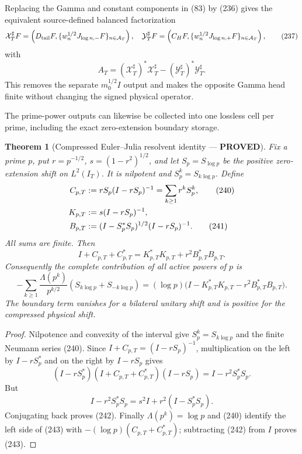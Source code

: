 \documentclass[11pt]{article}
\newtheorem{theorem}{Theorem}
\newcommand{\PROVED}{\textcolor{green!45!black}{\textbf{PROVED}}}
\begin{document}
Replacing the Gamma and constant components in (83) by (236) gives the
equivalent source-defined balanced factorization
\begin{equation}
 \mathcal X_T^\sharp F=
 \left(D_{\rm tail}F,\{w_n^{1/2}J_{\log n,-}F\}_{n\in\mathcal A_T}\right),
 \quad
 \mathcal Y_T^\sharp F=
 \left(C_HF,\{w_n^{1/2}J_{\log n,+}F\}_{n\in\mathcal A_T}\right), \tag{237}
\end{equation}
with
\begin{equation}
 A_T=(\mathcal X_T^\sharp)^*\mathcal X_T^\sharp
     -(\mathcal Y_T^\sharp)^*\mathcal Y_T^\sharp.    \tag{238}
\end{equation}
This removes the separate $m_0^{1/2}I$ output and makes the opposite Gamma
head finite without changing the signed physical operator.

The prime-power outputs can likewise be collected into one lossless cell per
prime, including the exact zero-extension boundary storage.

\begin{theorem}[Compressed Euler--Julia resolvent identity --- \PROVED]
Fix a prime $p$, put $r=p^{-1/2}$, $s=(1-r^2)^{1/2}$, and let
$S_p=S_{\log p}$ be the positive zero-extension shift on $L^2(I_T)$.  It is
nilpotent and $S_p^k=S_{k\log p}$.  Define
\begin{align}
 C_{p,T}&:=rS_p(I-rS_p)^{-1}
          =\sum_{k\ge1}r^kS_p^k,                     \tag{240}\\
 K_{p,T}&:=s(I-rS_p)^{-1},\notag\\
 B_{p,T}&:=(I-S_p^*S_p)^{1/2}(I-rS_p)^{-1}.          \tag{241}
\end{align}
All sums are finite.  Then
\begin{equation}
 \boxed{I+C_{p,T}+C_{p,T}^*
 =K_{p,T}^*K_{p,T}+r^2B_{p,T}^*B_{p,T}.}             \tag{242}
\end{equation}
Consequently the complete contribution of all active powers of $p$ is
\begin{equation}
 -\sum_{k\ge1}\frac{\Lambda(p^k)}{p^{k/2}}
   (S_{k\log p}+S_{-k\log p})
 = (\log p)\bigl(I-K_{p,T}^*K_{p,T}
                    -r^2B_{p,T}^*B_{p,T}\bigr).      \tag{243}
\end{equation}
The boundary term vanishes for a bilateral unitary shift and is positive for
the compressed physical shift.
\end{theorem}

\begin{proof}
Nilpotence and convexity of the interval give $S_p^k=S_{k\log p}$ and the
finite Neumann series (240).  Since
$I+C_{p,T}=(I-rS_p)^{-1}$, multiplication on the left by
$I-rS_p^*$ and on the right by $I-rS_p$ gives
\[
 (I-rS_p^*)(I+C_{p,T}+C_{p,T}^*)(I-rS_p)
 =I-r^2S_p^*S_p.
\]
But
\[
 I-r^2S_p^*S_p=s^2I+r^2(I-S_p^*S_p).
\]
Conjugating back proves (242).  Finally
$\Lambda(p^k)=\log p$ and (240) identify the left side of (243) with
$-(\log p)(C_{p,T}+C_{p,T}^*)$; subtracting (242) from $I$ proves (243).
\end{proof}
\end{document}
